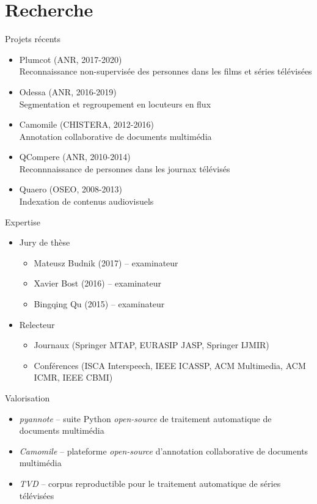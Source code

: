 \documentclass{simplecv}
\begin{document}
\section{Recherche}

\begin{topic}
\item[Projets r\'{e}cents]
\begin{itemize}
  \item Plumcot (ANR, 2017-2020)\\Reconnaissance non-supervis\'{e}e des personnes dans les films et s\'{e}ries t\'{e}l\'{e}vis\'{e}es
  \item Odessa (ANR, 2016-2019)\\Segmentation et regroupement en locuteurs en flux
  \item Camomile (CHISTERA, 2012-2016)\\Annotation collaborative de documents multim\'{e}dia
  \item QCompere (ANR, 2010-2014)\\Reconnnaissance de personnes dans les journax t\'{e}l\'{e}vis\'{e}s
  \item Quaero (OSEO, 2008-2013)\\Indexation de contenus audiovisuels
\end{itemize}

\item[Expertise]
\begin{itemize}
  \item Jury de th\`{e}se
  \begin{itemize}
    \item Mateusz Budnik (2017) -- examinateur
    \item Xavier Bost (2016) -- examinateur
    \item Bingqing Qu (2015) -- examinateur
  \end{itemize}
  \item Relecteur
  \begin{itemize}
    \item Journaux (Springer MTAP, EURASIP JASP, Springer IJMIR)
    \item Conf\'{e}rences (ISCA Interspeech, IEEE ICASSP, ACM Multimedia, ACM ICMR, IEEE CBMI)
  \end{itemize}
\end{itemize}

\item[Valorisation]
\begin{itemize}
  \item \emph{pyannote} -- suite Python \emph{open-source} de traitement automatique de documents multim\'{e}dia
  \item \emph{Camomile} -- plateforme \emph{open-source} d'annotation collaborative de documents multim\'{e}dia
  \item \emph{TVD} -- corpus reproductible pour le traitement automatique de s\'{e}ries t\'{e}l\'{e}vis\'{e}es
\end{itemize}

\end{topic}
\end{document}
